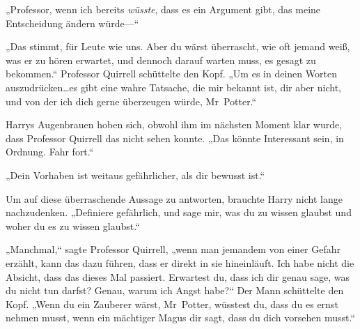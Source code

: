 „Professor, wenn ich bereits \emph{wüsste}, dass es ein Argument gibt, das meine Entscheidung ändern würde—“

„Das stimmt, für Leute wie uns. Aber du wärst überrascht, wie oft jemand weiß, was er zu hören erwartet, und dennoch darauf warten muss, es gesagt zu bekommen.“ Professor Quirrell schüttelte den Kopf. „Um es in deinen Worten auszudrücken…es gibt eine wahre Tatsache, die mir bekannt ist, dir aber nicht, und von der ich dich gerne überzeugen würde, Mr~Potter.“

Harrys Augenbrauen hoben sich, obwohl ihm im nächsten Moment klar wurde, dass Professor Quirrell das nicht sehen konnte. „Das könnte Interessant sein, in Ordnung. Fahr fort.“

„Dein Vorhaben ist weitaus gefährlicher, als dir bewusst ist.“

Um auf diese überraschende Aussage zu antworten, brauchte Harry nicht lange nachzudenken. „Definiere gefährlich, und sage mir, was du zu wissen glaubst und woher du es zu wissen glaubst.“

„Manchmal,“ sagte Professor Quirrell, „wenn man jemandem von einer Gefahr erzählt, kann das dazu führen, dass er direkt in sie hineinläuft. Ich habe nicht die Absicht, dass das dieses Mal passiert. Erwartest du, dass ich dir genau sage, was du nicht tun darfst? Genau, warum ich Angst habe?“ Der Mann schüttelte den Kopf. „Wenn du ein Zauberer wärst, Mr~Potter, wüsstest du, dass du es ernst nehmen musst, wenn ein mächtiger Magus dir sagt, dass du dich vorsehen musst.“

